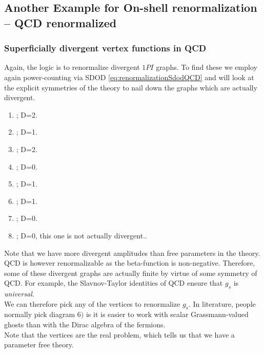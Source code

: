 





\subsection{Another Example for On-shell renormalization -- QCD renormalized}
\label{subsec:renormalizationqcd}
\subsubsection{Superficially divergent vertex functions in QCD}
Again, the logic is to renormalize divergent $1PI$ graphs. To find these we employ again power-counting via SDOD \ref{eq:renormalizationSdodQCD} and will look at the explicit symmetries of the theory to nail down the graphs which are actually divergent.
\begin{enumerate}
\item {}; \quad D=2.
\item {}; \quad D=1.
\item {}; \quad D=2.
\item {}; \quad D=0.
\item {}; \quad D=1.
\item {}; \quad D=1.
\item {}; \quad D=0.
\item {}; \quad D=0, this one is not actually divergent..
\end{enumerate}
Note that we have more divergent amplitudes than free parameters in the theory. QCD is however renormalizable as the beta-function is non-negative. Therefore, some of these divergent graphs are actually finite by virtue of some symmetry of QCD. For example, the Slavnov-Taylor identities of QCD  ensure that $g_s$ is \emph{universal}.\\
We can therefore pick any of the vertices to renormalize $g_s$. In literature, people normally pick diagram $6)$ is it is easier to work with scalar Grassmann-valued ghosts than with the Dirac algebra of the fermions. \\
Note that the vertices are the real problem, which tells us that we have a parameter free theory.
